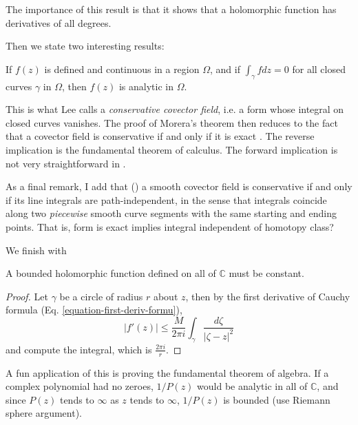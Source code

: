 \noindent
The importance of this result is that it
shows that a holomorphic function has
derivatives of all degrees.

Then we state two interesting results:

\begin{theorem}[Morera]
\label{theorem-Morera}
\begin{reference}
\cite[p. 122]{ahl}
\end{reference}
If $f(z)$ is defined and continuous in a
region $\Omega$, and if
$\int_\gamma fdz=0$ for all closed curves
$\gamma$ in $\Omega$, then $f(z)$ is
analytic in $\Omega$.
\end{theorem}

\noindent
This is what Lee calls a {\it conservative
covector field}, i.e. a form whose
integral on closed curves vanishes. The proof
of Morera's theorem then reduces
to the fact that a covector field is
conservative if and only if it is exact
\cite[Theorem 11.42]{les}. The reverse
implication is the fundamental theorem of
calculus. The forward implication is not very
straightforward in \cite{les}.

As a final remark, I add that
(\cite[Propoistion 11.40]{les}) a smooth
covector
field is conservative if and only if its line
integrals are path-independent, in
the sense that integrals coincide along two
{\it piecewise} smooth curve
segments with the same starting and ending
points. That is, form is exact
implies integral independent of homotopy
class?

We finish with

\begin{theorem}[Liouville]
\label{theorem-Liouville}
A bounded holomorphic function defined on all
of $\mathbb{C}$ must be constant.
\end{theorem}

\begin{proof}
Let $\gamma$ be a circle of radius $r$ about
$z$, then by the first derivative
of Cauchy formula (Eq.
\ref{equation-first-deriv-formu}),
$$
|f'(z)|\leq \frac{M}{2\pi i}\int_\gamma
\frac{d\zeta}{|\zeta-z|^2}
$$
and compute the integral, which is
$\frac{2\pi i}{r}$.
\end{proof}

\noindent
A fun application of this is proving the
fundamental theorem of algebra. If a
complex polynomial had no zeroes, $1/P(z)$
would be analytic in all of
$\mathbb{C}$, and since $P(z)$ tends to
$\infty$ as $z$ tends to $\infty$,
$1/P(z)$ is bounded (use Riemann sphere
argument).

